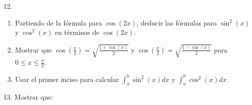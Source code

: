 \documentclass[12pt]{article}
\begin{document}
12.
\begin{enumerate}[\hspace{9px} a)]
    \item Partiendo de la f\'ormula para $\cos(2x)$, deducir las f\'ormulas para $\sin^2(x)$ y $\cos^2(x)$ en t\'erminos de $\cos(2x)$.

    \item Mostrar que \(\cos\left(\displaystyle\frac{x}{2}\right)=\sqrt{\frac{1+\cos(x)}{2}}\) y \(\cos\left(\displaystyle\frac{x}{2}\right)=\sqrt{\frac{1-\cos(x)}{2}}\) para \(0 \leq x \leq \displaystyle\frac{\pi}{2}\).

    \item Usar el primer inciso para calcular \(\displaystyle\int_{a}^{b}\sin^2(x)dx\) y \(\displaystyle\int_{a}^{b}\cos^2(x)dx\).

\end{enumerate}

13. Mostrar que:
\end{document}
